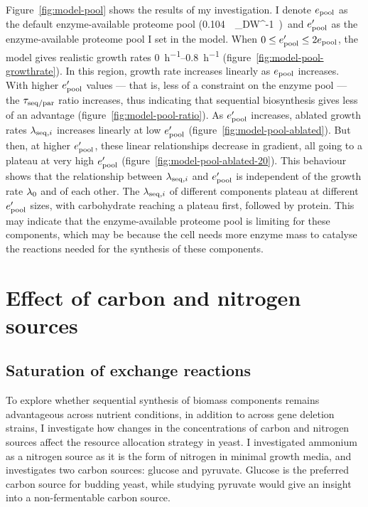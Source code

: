Figure~\ref{fig:model-pool} shows the results of my investigation.
I denote $e_{\mathrm{pool}}$ as the default enzyme-available proteome pool (\SI{0.104}{\gram~\gram_{DW}^{-1}}) and $e_{\mathrm{pool}}^{\prime}$ as the enzyme-available proteome pool I set in the model.
When $0 \leq e_{\mathrm{pool}}^{\prime} \leq 2e_{\mathrm{pool}}$, the model gives realistic growth rates \SIrange{0}{0.8}{\hour^{-1}} (figure~\ref{fig:model-pool-growthrate}).
In this region, growth rate increases linearly as $e_{\mathrm{pool}}$ increases.
With higher $e_{\mathrm{pool}}^{\prime}$ values --- that is, less of a constraint on the enzyme pool --- the $\tau_{\mathrm{seq}/\mathrm{par}}$ ratio increases, thus indicating that sequential biosynthesis gives less of an advantage (figure~\ref{fig:model-pool-ratio}).
As $e_{\mathrm{pool}}^{\prime}$ increases, ablated growth rates $\lambda_{\mathrm{seq},i}$ increases linearly at low $e_{\mathrm{pool}}^{\prime}$ (figure~\ref{fig:model-pool-ablated}).
But then, at higher $e_{\mathrm{pool}}^{\prime}$, these linear relationships decrease in gradient, all going to a plateau at very high $e_{\mathrm{pool}}^{\prime}$ (figure~\ref{fig:model-pool-ablated-20}).
This behaviour shows that the relationship between $\lambda_{\mathrm{seq},i}$ and $e_{\mathrm{pool}}^{\prime}$ is independent of the growth rate $\lambda_{0}$ and of each other.
The $\lambda_{\mathrm{seq},i}$ of different components plateau at different $e_{\mathrm{pool}}^{\prime}$ sizes, with carbohydrate reaching a plateau first, followed by protein.
This may indicate that the enzyme-available proteome pool is limiting for these components, which may be because the cell needs more enzyme mass to catalyse the reactions needed for the synthesis of these components.


\section{Effect of carbon and nitrogen sources}
\label{sec:model-exchange}

\subsection{Saturation of exchange reactions}
\label{subsec:model-saturation}

To explore whether sequential synthesis of biomass components remains advantageous across nutrient conditions, in addition to across gene deletion strains, I investigate how changes in the concentrations of carbon and nitrogen sources affect the resource allocation strategy in yeast.
I investigated ammonium as a nitrogen source as it is the form of nitrogen in minimal growth media, and investigates two carbon sources: glucose and pyruvate.
Glucose is the preferred carbon source for budding yeast, while studying pyruvate would give an insight into a non-fermentable carbon source.

